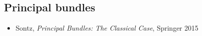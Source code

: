 \subsection*{Principal bundles}

\begin{itemize}
\item Sontz, \textit{Principal Bundles: The Classical Case}, Springer 2015
\end{itemize}










